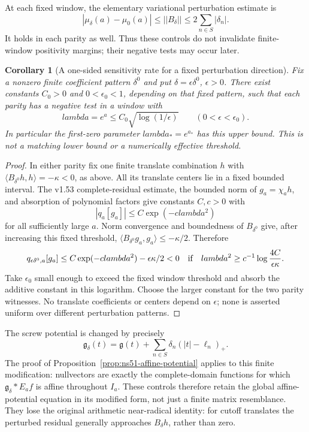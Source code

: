 \documentclass[11pt]{article}
\def\lambda{lambda}%
\def\norm#1{||#1||}%
\newtheorem{corollary}[theorem]{Corollary}
\theoremstyle{remark}
\newcommand{\norm}[1]{\left\lVert #1\right\rVert}
\begin{document}
At each fixed window, the elementary variational perturbation estimate is
\[
 |\mu_\delta(a)-\mu_0(a)|\le\norm{B_\delta}
                    \le2\sum_{n\in S}|\delta_n|.
\]
It holds in each parity as well. Thus these controls do not invalidate
finite-window positivity margins; their negative tests may occur later.

\begin{corollary}[A one-sided sensitivity rate for a fixed perturbation direction]\label{cor:ns57-fixed-direction-sensitivity}
Fix a nonzero finite coefficient pattern $\delta^0$ and put
$\delta=\epsilon\delta^0$, $\epsilon>0$. There exist constants
$C_0>0$ and $0<\epsilon_0<1$, depending on that fixed pattern, such
that each parity has a negative test in a window with
\[
 \lambda=e^a\le C_0\sqrt{\log(1/\epsilon)}
       \qquad(0<\epsilon<\epsilon_0).
\]
In particular the first-zero parameter $\lambda_*=e^{a_*}$ has this upper bound.
This is not a matching lower bound or a numerically effective threshold.
\end{corollary}
\begin{proof}
In either parity fix one finite translate combination $h$ with
$\langle B_{\delta^0}h,h\rangle=-\kappa<0$, as above.
All its translate centers lie in a fixed bounded interval. The
v1.53 complete-residual estimate, the bounded norm of $g_a=\chi_a h$,
and absorption of polynomial factors give constants $C,c>0$ with
\[
 |q_a[g_a]|\le C\exp(-c\lambda^2)
\]
for all sufficiently large $a$. Norm convergence and boundedness of
$B_{\delta^0}$ give, after increasing this fixed threshold,
$\langle B_{\delta^0}g_a,g_a\rangle\le-\kappa/2$.
Therefore
\[
 q_{\epsilon\delta^0,a}[g_a]
 \le C\exp(-c\lambda^2)-\epsilon\kappa/2<0
 \quad\hbox{if}\quad
 \lambda^2\ge c^{-1}\log\frac{4C}{\epsilon\kappa}.
\]
Take $\epsilon_0$ small enough to exceed the fixed window threshold
and absorb the additive constant in this logarithm. Choose the larger
constant for the two parity witnesses. No translate coefficients or
centers depend on $\epsilon$; none is asserted uniform over different
perturbation patterns.
\end{proof}

The screw potential is changed by precisely
\[
 \mathfrak g_\delta(t)=\mathfrak g(t)+
                 \sum_{n\in S}\delta_n(|t|-\ell_n)_+.
\]
The proof of Proposition~\ref{prop:ns51-affine-potential} applies to this finite modification:
nullvectors are exactly the complete-domain functions for which
$\mathfrak g_\delta*E_af$ is affine throughout $I_a$.
These controls therefore retain the global affine-potential equation
in its modified form, not just a finite matrix resemblance.
They lose the original arithmetic near-radical identity:
for cutoff translates the perturbed residual generally approaches
$B_\delta h$, rather than zero.
\end{document}
